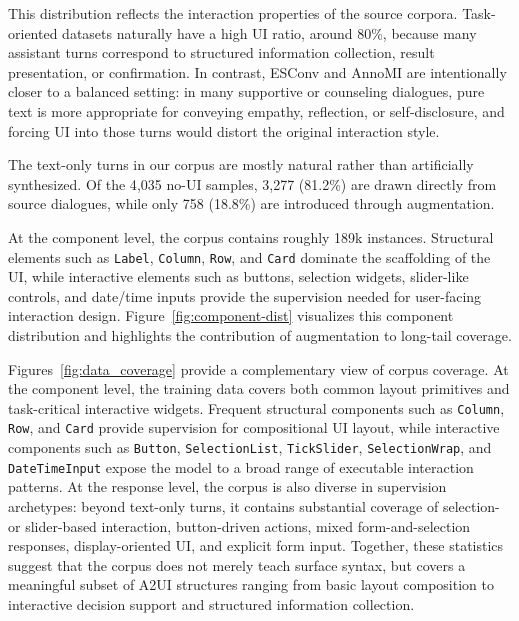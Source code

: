 This distribution reflects the interaction properties of the source corpora. Task-oriented datasets naturally have a high UI ratio, around 80\%, because many assistant turns correspond to structured information collection, result presentation, or confirmation. In contrast, ESConv and AnnoMI are intentionally closer to a balanced setting: in many supportive or counseling dialogues, pure text is more appropriate for conveying empathy, reflection, or self‑disclosure, and forcing UI into those turns would distort the original interaction style.

The text-only turns in our corpus are mostly natural rather than artificially synthesized. Of the 4{,}035 no-UI samples, 3{,}277 (81.2\%) are drawn directly from source dialogues, while only 758 (18.8\%) are introduced through augmentation.

At the component level, the corpus contains roughly 189k instances. Structural elements such as \texttt{Label}, \texttt{Column}, \texttt{Row}, and \texttt{Card} dominate the scaffolding of the UI, while interactive elements such as buttons, selection widgets, slider-like controls, and date/time inputs provide the supervision needed for user-facing interaction design. 
Figure~\ref{fig:component-dist} visualizes this component distribution and highlights the contribution of augmentation to long-tail coverage.

Figures~\ref{fig:data_coverage} provide a complementary view of corpus coverage. At the component level, the training data covers both common layout primitives and task-critical interactive widgets. Frequent structural components such as \texttt{Column}, \texttt{Row}, and \texttt{Card} provide supervision for compositional UI layout, while interactive components such as \texttt{Button}, \texttt{SelectionList}, \texttt{TickSlider}, \texttt{SelectionWrap}, and \texttt{DateTimeInput} expose the model to a broad range of executable interaction patterns. At the response level, the corpus is also diverse in supervision archetypes: beyond text-only turns, it contains substantial coverage of selection- or slider-based interaction, button-driven actions, mixed form-and-selection responses, display-oriented UI, and explicit form input. Together, these statistics suggest that the corpus does not merely teach surface syntax, but covers a meaningful subset of A2UI structures ranging from basic layout composition to interactive decision support and structured information collection.
